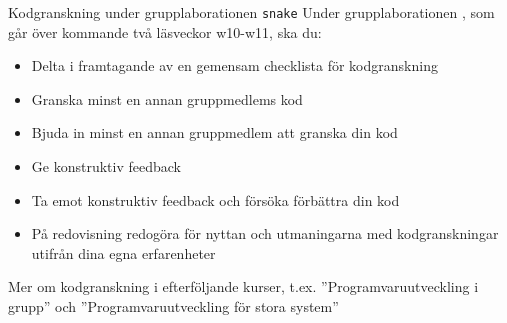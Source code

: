 
\begin{Slide}{Kodgranskning under grupplaborationen \texttt{snake}}
Under grupplaborationen , som går över kommande två läsveckor w10-w11, ska du:
\begin{itemize}
\item Delta i framtagande av en gemensam checklista för kodgranskning
\item Granska minst en annan gruppmedlems kod 
\item Bjuda in minst en annan gruppmedlem att granska din kod
\item Ge konstruktiv feedback
\item Ta emot konstruktiv feedback och försöka förbättra din kod
\item På redovisning redogöra för nyttan och utmaningarna med kodgranskningar utifrån dina egna erfarenheter
\end{itemize}
Mer om kodgranskning i efterföljande kurser, t.ex. ''Programvaruutveckling i grupp'' och ''Programvaruutveckling för stora system''
\end{Slide}
